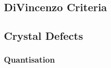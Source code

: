 \cite{Xie2021}


\subsection{DiVincenzo Criteria}
\cite{RevModPhys.89.035002}
\cite{Crawford2021}

\subsection{Crystal Defects}

\cite{Kraus2014}

\cite{Kanai2022}

\subsubsection{Quantisation}
